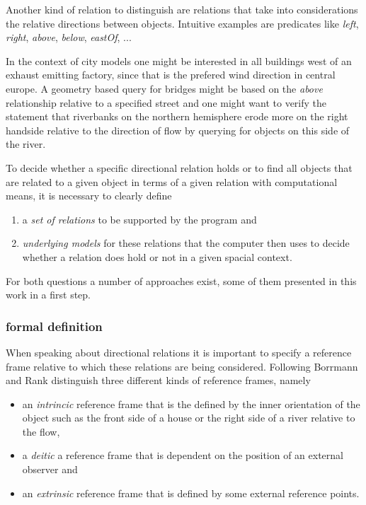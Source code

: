 \documentclass[paper=a4, fontsize=11pt]{scrartcl} %
\numberwithin{equation}{section} %
\numberwithin{figure}{section} %
\numberwithin{table}{section} %
\begin{document}
Another kind of relation to distinguish are relations that take into considerations the relative directions between objects. Intuitive examples are predicates like \emph{left}, \emph{right}, \emph{above}, \emph{below}, \emph{eastOf}, ...

In the context of city models one might be interested in all buildings west of an exhaust emitting factory, since that is the prefered wind direction in central europe. A geometry based query for bridges might be based on the \emph{above} relationship relative to a specified street and one might want to verify the statement that riverbanks on the northern hemisphere erode more on the right handside relative to the direction of flow by querying for objects on this side of the river. 

To decide whether a specific directional relation holds or to find all objects that are related to a given object in terms of a given relation with computational means, it is necessary to clearly define

\begin{enumerate}
\item a \emph{set of relations} to be supported by the program and
\item \emph{underlying models} for these relations that the computer then uses to decide whether a relation does hold or not in a given spacial context. 
\end{enumerate}

For both questions a number of approaches exist, some of them presented in this work in a first step. 

\subsubsection{formal definition}

When speaking about directional relations it is important to specify a reference frame relative to which these relations are being considered. Following \cite{Retz-Schmidt:1988:VVS:46184.46189} Borrmann and Rank \cite{Borrmann:2009:AEI} distinguish three different kinds of reference frames, namely
\begin{itemize}
\item an \emph{intrincic} reference frame that is the defined by the inner orientation of the object such as the front side of a house or the right side of a river relative to the flow,
\item a \emph{deitic} a reference frame that is dependent on the position of an external observer and 
\item an \emph{extrinsic} reference frame that is defined by some external reference points. 
\end{itemize}
\end{document}
